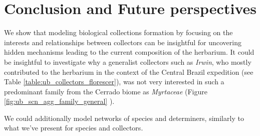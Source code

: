 \chapter{Conclusion and Future perspectives}\label{conclusion_perspectives}





We show that modeling biological collections formation by focusing on the interests and relationships between collectors can be insightful for uncovering hidden mechanisms leading to the current composition of the herbarium. 
It could be insightful to investigate why a generalist collectors such as \textit{Irwin}, who mostly contributed to the herbarium in the context of the Central Brazil expedition (see Table \ref{table:ub_collectors_florescer}), was not very interested in such a predominant family from the Cerrado biome as \textit{Myrtaceae} (Figure \ref{fig:ub_scn_agg_family_general} ).


We could additionally model networks of species and determiners, similarly to what we've present for species and collectors.











